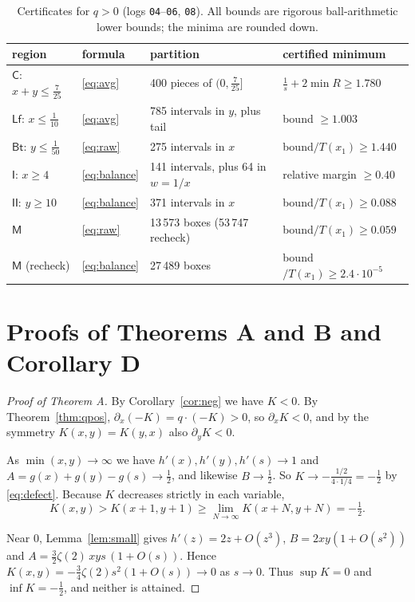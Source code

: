 \documentclass[11pt,a4paper]{article}
\theoremstyle{definition}
\theoremstyle{remark}
\begin{document}
\begin{table}[ht]
\centering
\small
\begin{tabular}{@{}llll@{}}
\toprule
region & formula & partition & certified minimum\\
\midrule
$\mathsf C$: $x+y\le\frac7{25}$ & \eqref{eq:avg} & 400 pieces of $(0,\frac7{25}]$ & $\frac1s+2\min R\ge1.780$\\
$\mathsf{Lf}$: $x\le\frac1{10}$ & \eqref{eq:avg} & 785 intervals in $y$, plus tail & bound $\ge1.003$\\
$\mathsf{Bt}$: $y\le\frac1{50}$ & \eqref{eq:raw} & 275 intervals in $x$ & bound$/T(x_1)\ge1.440$\\
$\mathsf I$: $x\ge4$ & \eqref{eq:balance} & 141 intervals, plus 64 in $w=1/x$ & relative margin $\ge0.40$\\
$\mathsf{II}$: $y\ge10$ & \eqref{eq:balance} & 371 intervals in $x$ & bound$/T(x_1)\ge0.088$\\
$\mathsf M$ & \eqref{eq:raw} & 13\,573 boxes (53\,747 recheck) & bound$/T(x_1)\ge0.059$\\
$\mathsf M$ (recheck) & \eqref{eq:balance} & 27\,489 boxes & bound$/T(x_1)\ge2.4\cdot10^{-5}$\\
\bottomrule
\end{tabular}
\caption{Certificates for $q>0$ (logs \texttt{04}--\texttt{06}, \texttt{08}). All bounds are rigorous ball-arithmetic lower bounds; the minima are rounded down.}\label{tab:regions}
\end{table}

\section{Proofs of Theorems A and B and Corollary D}\label{sec:main}
\begin{proof}[Proof of Theorem A]
By Corollary~\ref{cor:neg} we have $K<0$. By Theorem~\ref{thm:qpos}, $\partial_x(-K)=q\cdot(-K)>0$, so $\partial_xK<0$, and by the symmetry $K(x,y)=K(y,x)$ also $\partial_yK<0$.

As $\min(x,y)\to\infty$ we have $h'(x),h'(y),h'(s)\to1$ and $A=g(x)+g(y)-g(s)\to\frac12$, and likewise $B\to\frac12$. So $K\to-\frac{1/2}{4\cdot1/4}=-\frac12$ by \eqref{eq:defect}. Because $K$ decreases strictly in each variable,
\[
K(x,y)>K(x+1,y+1)\ge\lim_{N\to\infty}K(x+N,y+N)=-\tfrac12 .
\]

Near $0$, Lemma~\ref{lem:small} gives $h'(z)=2z+O(z^3)$, $B=2xy(1+O(s^2))$ and $A=\tfrac32\zeta(2)\,xys\,(1+O(s))$. Hence $K(x,y)=-\frac34\zeta(2)s^2(1+O(s))\to0$ as $s\to0$. Thus $\sup K=0$ and $\inf K=-\frac12$, and neither is attained.
\end{proof}
\end{document}
